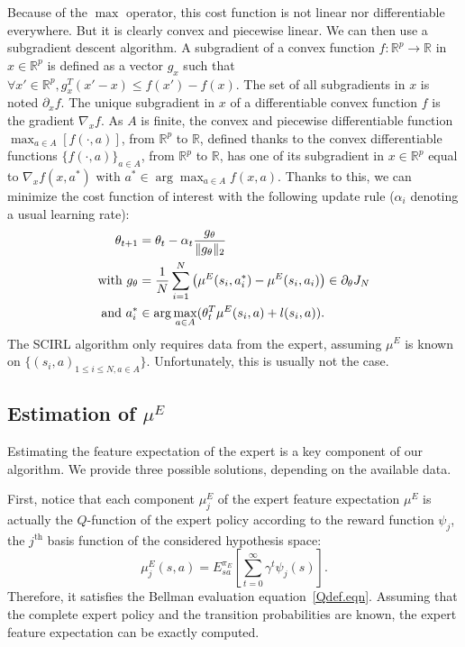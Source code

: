 \documentclass[tablecaption=bottom]{jmlr}
\begin{document}
Because of the $\max$ operator, this cost function is not linear nor
differentiable everywhere. But it is clearly convex and piecewise
linear.
%
We can then use a subgradient descent algorithm. A subgradient of a
convex function $f:\mathbb{R}^p\rightarrow \mathbb{R}$ in
$x\in\mathbb{R}^p$ is defined as a vector $g_x$ such that $\forall
x' \in \mathbb{R}^p, g_x^T(x'-x)\leq f(x')-f(x)$. The set of all
subgradients in $x$ is noted $\partial_xf$. The unique subgradient
in $x$ of a differentiable convex function $f$ is the gradient
$\nabla_xf$. As $A$ is finite, the convex and piecewise
differentiable function $\max_{a\in A}[f(\cdot,a)]$, from
$\mathbb{R}^p$ to $\mathbb{R}$, defined thanks to the convex
differentiable functions $\{f(\cdot,a)\}_{a\in A}$, from
$\mathbb{R}^p$ to $\mathbb{R}$, has one of its subgradient in
$x\in\mathbb{R}^p$ equal to $\nabla_xf(x,a^*)$ with
$a^*\in\arg\max_{a\in A}f(x,a)$. Thanks to this, we can minimize the
cost function of interest with the following update rule ($\alpha_i$
denoting a usual learning rate):%
\begin{align}
  \theta_{t+1}&=\theta_t -\alpha_t\frac{g_{\theta}}{\|g_{\theta}\|_2}
  \\
  \text{with }
  g_{\theta} &= {1\over N}\sum\limits_{i=1}^N\left(\mu^E(s_i,a^*_i) - \mu^E(s_i,a_i)\right)\in \partial_\theta J_N
  \\
  \text{and } a^*_i &\in \arg\max_{a\in A}(\theta_t^T \mu^E(s_i,a) +
  l(s_i,a)).
\end{align}
The SCIRL algorithm only requires data from the expert, assuming
$\mu^E$ is known on $\{(s_i,a)_{1\leq i \leq N,a\in A}\}$.
Unfortunately, this is usually not the case.


\subsection{Estimation of $\mu^E$}
\label{calculmu.sec}

Estimating the feature expectation of the expert is a key component
of our algorithm. We provide three possible solutions, depending on
the available data.

First, notice that each component $\mu_j^E$ of the expert feature
expectation $\mu^E$ is actually the $Q$-function of the expert
policy according to the reward function $\psi_j$, the $j^\text{th}$
basis function of the considered hypothesis space:
\begin{equation}
\mu^E_j(s,a) = E^{\pi_E}_{sa}[\sum\limits_{t=0}^\infty \gamma^t
\psi_j(s)].\label{eq:muE_bellman}
\end{equation}
Therefore, it satisfies the Bellman evaluation
equation~\eqref{Qdef.eqn}. Assuming that the complete expert policy and the
transition probabilities are known, the expert feature expectation
can be exactly computed.
\end{document}
